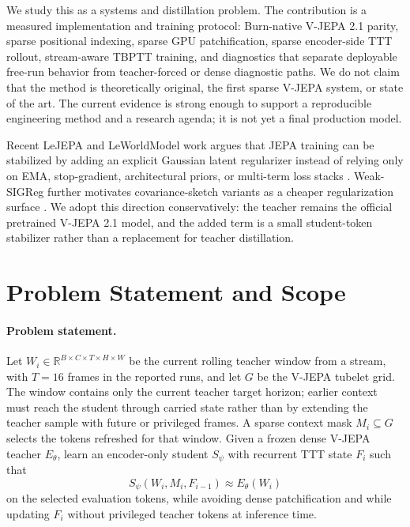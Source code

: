 \documentclass[10pt]{article}
\begin{document}
We study this as a systems and distillation problem.  The contribution is a
measured implementation and training protocol: Burn-native V-JEPA 2.1 parity,
sparse positional indexing, sparse GPU patchification, sparse encoder-side TTT
rollout, stream-aware TBPTT training, and diagnostics that separate deployable
free-run behavior from teacher-forced or dense diagnostic paths.  We do not
claim that the method is theoretically original, the first sparse V-JEPA
system, or state of the art.  The current evidence is strong enough to support
a reproducible engineering method and a research agenda; it is not yet a final
production model.

Recent LeJEPA and LeWorldModel work argues that JEPA training can be stabilized
by adding an explicit Gaussian latent regularizer instead of relying only on
EMA, stop-gradient, architectural priors, or multi-term loss stacks
\cite{balestriero2025lejepa,maes2026leworldmodel}.  Weak-SIGReg further
motivates covariance-sketch variants as a cheaper regularization surface
\cite{akbar2026weaksigreg}.  We adopt this direction conservatively: the
teacher remains the official pretrained V-JEPA 2.1 model, and the added term is
a small student-token stabilizer rather than a replacement for teacher
distillation.

\section{Problem Statement and Scope}

\paragraph{Problem statement.}
Let $W_i\in\mathbb{R}^{B\times C\times T\times H\times W}$ be the current
rolling teacher window from a stream, with $T=16$ frames in the reported runs,
and let $G$ be the V-JEPA tubelet grid.  The window contains only the current
teacher target horizon; earlier context must reach the student through carried
state rather than by extending the teacher sample with future or privileged
frames.  A sparse context mask $M_i\subseteq G$ selects the tokens refreshed for
that window.  Given a frozen dense V-JEPA teacher $E_\theta$, learn an
encoder-only student $S_\psi$ with recurrent TTT state $F_i$ such that
\begin{equation}
  S_\psi(W_i,M_i,F_{i-1}) \approx E_\theta(W_i)
\end{equation}
on the selected evaluation tokens, while avoiding dense patchification and
while updating $F_i$ without privileged teacher tokens at inference time.
\end{document}
